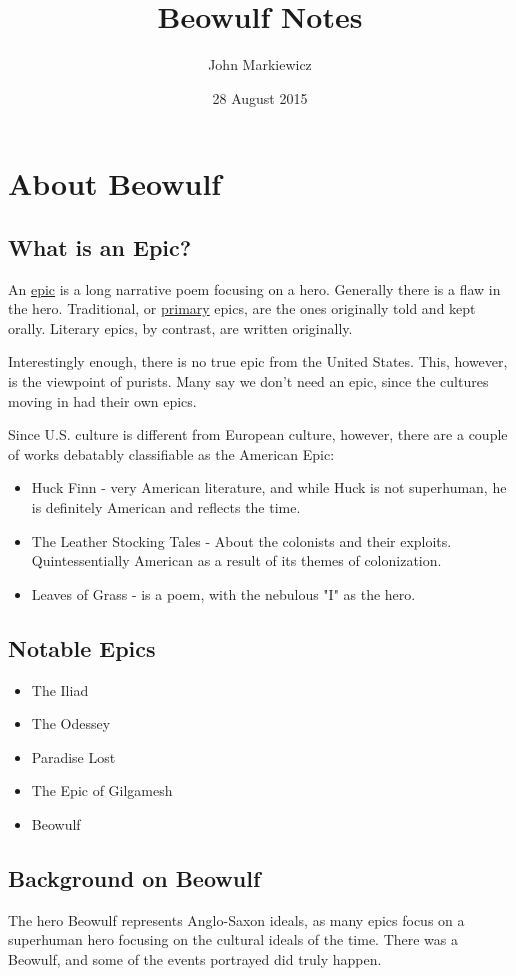 \documentclass[11pt]{article}
\begin{document}
\title{Beowulf Notes}
\author{John Markiewicz}
\date{28 August 2015}
\maketitle
\section{About Beowulf}
\subsection{What is an Epic?}
	An \underline{epic} is a long narrative poem focusing on a hero.  Generally
	there is a flaw in the hero.  Traditional, or \underline{primary} epics, are
	the ones originally told and kept orally.  Literary epics, by contrast, are
	written originally.

	Interestingly enough, there is no true epic from the United States.  This,
	however, is the viewpoint of purists.  Many say we don't need an epic, since
	the cultures moving in had their own epics.

	Since U.S. culture is different from European culture, however, there are a
	couple of works debatably classifiable as the American Epic:
	\begin{itemize}
		\item Huck Finn - very American literature, and while Huck is not
			superhuman, he is definitely American and reflects the time.
		\item The Leather Stocking Tales - About the colonists and their exploits.
			Quintessentially American as a result of its themes of colonization.
		\item Leaves of Grass - is a poem, with the nebulous "I" as the hero.
	\end{itemize}
\subsection{Notable Epics}
	\begin{itemize}
		\item The Iliad
		\item The Odessey
		\item Paradise Lost
		\item The Epic of Gilgamesh
		\item Beowulf
	\end{itemize}
\subsection{Background on Beowulf}
	The hero Beowulf represents Anglo-Saxon ideals, as many epics focus on a
	superhuman hero focusing on the cultural ideals of the time.  There was a
	Beowulf, and some of the events portrayed did truly happen.
\end{document}
